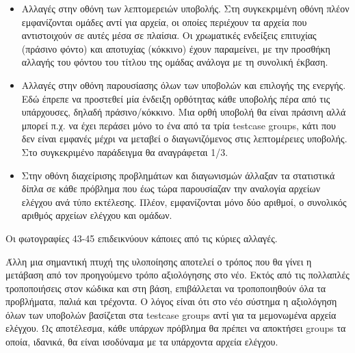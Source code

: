 \documentclass[diploma]{softlab-thesis}
\begin{document}
\begin{itemize}
    \item Αλλαγές στην οθόνη των λεπτομερειών υποβολής. Στη συγκεκριμένη
      οθόνη πλέον εμφανίζονται ομάδες αντί για αρχεία, οι οποίες περιέχουν
      τα αρχεία που αντιστοιχούν σε αυτές μέσα σε πλαίσια. Οι χρωματικές ενδείξεις
      επιτυχίας (πράσινο φόντο) και αποτυχίας (κόκκινο) έχουν παραμείνει, με την
      προσθήκη αλλαγής του φόντου του τίτλου της ομάδας ανάλογα με τη συνολική
      έκβαση.

    \item Αλλαγές στην οθόνη παρουσίασης όλων των υποβολών και επιλογής της ενεργής.
      Εδώ έπρεπε να προστεθεί μία ένδειξη ορθότητας κάθε υποβολής πέρα από τις
      υπάρχουσες, δηλαδή πράσινο/κόκκινο. Μια ορθή υποβολή θα είναι πράσινη αλλά
      μπορεί π.χ. να έχει περάσει μόνο το ένα από τα τρία testcase groups, κάτι
      που δεν είναι εμφανές μέχρι να μεταβεί ο διαγωνιζόμενος στις λεπτομέρειες
      υποβολής. Στο συγκεκριμένο παράδειγμα θα αναγράφεται 1/3.

    \item Στην οθόνη διαχείρισης προβλημάτων και διαγωνισμών άλλαξαν τα στατιστικά
      δίπλα σε κάθε πρόβλημα που έως τώρα παρουσίαζαν την αναλογία αρχείων ελέγχου
      ανά τύπο εκτέλεσης. Πλέον, εμφανίζονται μόνο δύο αριθμοί, ο συνολικός αριθμός
      αρχείων ελέγχου και ομάδων.

\end{itemize}

Οι φωτογραφίες 43-45 επιδεικνύουν κάποιες από τις κύριες αλλαγές.

\bigskip

Άλλη μια σημαντική πτυχή της υλοποίησης αποτελεί ο τρόπος που θα γίνει η
μετάβαση από τον προηγούμενο τρόπο αξιολόγησης στο νέο. Εκτός από τις πολλαπλές
τροποποιήσεις στον κώδικα και στη βάση, επιβάλλεται να τροποποιηθούν όλα τα
προβλήματα, παλιά και τρέχοντα. Ο λόγος είναι ότι στο νέο σύστημα η αξιολόγηση όλων
των υποβολών βασίζεται στα testcase groups αντί για τα μεμονωμένα αρχεία ελέγχου.
Ως αποτέλεσμα, κάθε υπάρχων πρόβλημα θα πρέπει να αποκτήσει groups τα οποία,
ιδανικά, θα είναι ισοδύναμα με τα υπάρχοντα αρχεία ελέγχου.

\bigskip
\end{document}

